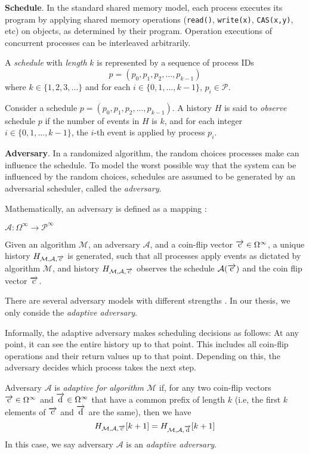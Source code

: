 \textbf{Schedule}.
In the standard shared memory model, each process executes its program by applying
shared memory operations (\texttt{read()}, \texttt{write(x)}, \texttt{CAS(x,y)}, etc) on objects,
as determined by their program. Operation executions of concurrent processes
can be interleaved arbitrarily.

A \emph{schedule} with \emph{length} $k$ is represented by a sequence of process IDs
$$p = (p_0, p_1, p_2,..., p_{k-1})$$ where $k \in \{1, 2, 3, ...\}$ and for each $i \in \{0, 1, ..., k-1\}$,
$p_i \in \mathcal{P}$.

Consider a schedule $p = (p_0, p_1, p_2,..., p_{k-1})$.
A history $H$ is said to \emph{observe} schedule $p$ if the number of events in $H$ is $k$,
and for each integer $i \in \{0, 1, ..., k-1\}$, the $i$-th event is applied by process $p_i$.

\textbf{Adversary}.
In a randomized algorithm, the random choices processes make can influence the schedule.
To model the worst possible way that the system can be influenced by the random choices,
schedules are assumed to be generated by an adversarial scheduler, called the \emph{adversary}.

Mathematically, an adversary is defined as a mapping \cite{golab2011linearizable}:
\begin{center}
$\mathcal{A} :  \Omega^{\infty} \to \mathcal{P}^{\infty}$
\end{center}

Given an algorithm $\mathcal{M}$, an adversary $\mathcal{A}$, and
a coin-flip vector $\overrightarrow{\rm c} \in \Omega^{\infty}$,
a unique history $H_{\mathcal{M},\mathcal{A}, \overrightarrow{\rm c}}$ is generated, such that all
processes apply events as dictated by algorithm $\mathcal{M}$, and history
$H_{\mathcal{M}, \mathcal{A}, \overrightarrow{\rm c}}$
observes the schedule $\mathcal{A(\overrightarrow{\rm c})}$ and the coin flip vector $\overrightarrow{\rm c}$.

There are several adversary models with different strengths \cite{DBLP:journals/corr/cs-DS-0209014}.
In our thesis, we only conside the \emph{adaptive adversary}.

Informally, the adaptive adversary makes scheduling
decisions as follows: At any point, it can see the entire history up to that point.
This includes all coin-flip operations and their return values up to that point. Depending on this,
the adversary decides which process takes the next step.

Adversary $\mathcal{A}$ is \emph{adaptive for algorithm $\mathcal{M}$} \cite{golab2011linearizable}
if, for any two coin-flip
vectors $\overrightarrow{\rm c} \in \Omega^{\infty}$ and $\overrightarrow{\rm d} \in \Omega^{\infty}$ that have a common prefix
of length $k$ (i.e, the first $k$ elements of $\overrightarrow{\rm c}$ and $\overrightarrow{\rm d}$ are the same), then we have
$$H_{\mathcal{M},\mathcal{A}, \overrightarrow{\rm c}}[k+1] = H_{\mathcal{M},\mathcal{A}, \overrightarrow{\rm d}}[k+1]$$
In this case, we say adversary $\mathcal{A}$ is an \emph{adaptive adversary}.

